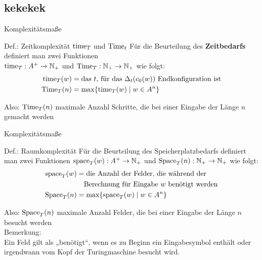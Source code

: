 \subsection{kekekek}
\begin{frame}{Komplexitätsmaße}
	\begin{block}{Def.: Zeitkomplexität $\mathord{\text{time}}_T$ und $\mathord{\text{Time}}_t$}
		Für die Beurteilung des \textbf{Zeitbedarfs} definiert man zwei Funktionen \\
		$\mathord{\text{time}}_T:A^+ \to \mathbb{N}_+$ und $\mathord{\text{Time}}_T:\mathbb{N}_+ \to \mathbb{N}_+$ wie folgt:
		\begin{align*}
  			\mathord{\text{time}}_T(w) &= \text{das $t$, für das $\Delta_t(c_0(w))$ Endkonfiguration ist} \\
  			\mathord{\text{Time}}_T(n)   &= \max \{\mathord{\text{time}}_T(w) \mid w\in A^n\}
		\end{align*}
	\end{block}

	Also: $\mathord{\text{Time}}_T(n)$ maximale Anzahl Schritte, die bei einer Eingabe der Länge $n$ gemacht werden
\end{frame}

\begin{frame}{Komplexitätsmaße}
    \begin{block}{Def.: Raumkomplexität}
    	Für die Beurteilung des Speicherplatzbedarfs definiert man zwei
		Funktionen $\mathord{\text{space}}_T(w):A^+ \to \mathbb{N}_+$ und $\mathord{\text{Space}}_T(n):\mathbb{N}_+ \to \mathbb{N}_+$ wie folgt:
			\begin{align*}
  			\mathord{\text{space}}_T(w) &= \text{die Anzahl der Felder, die während der }\\
               			&\quad  \text{Berechnung für Eingabe $w$ benötigt werden}\\
  			\mathord{\text{Space}}_T(n)   &= \max \{\mathord{\text{space}}_T(w) \mid w\in A^n\} 
			\end{align*}
    \end{block}

    Also: $\mathord{\text{Space}}_T(n)$ maximale Anzahl Felder, die bei einer Eingabe der Länge $n$ besucht werden\\[1em]
    Bemerkung:\\
    Ein Feld gilt als „benötigt“, wenn es zu Beginn ein Eingabesymbol enthält oder irgendwann vom Kopf der Turingmaschine besucht wird. 
\end{frame}

